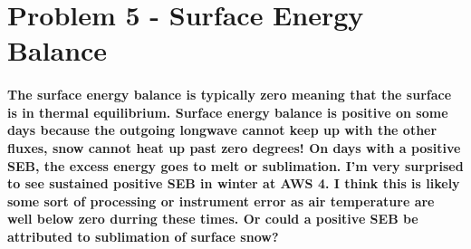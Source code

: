 \documentclass[11pt]{article}
\begin{document}
    \section{Problem 5 - Surface Energy
Balance}\label{problem-5---surface-energy-balance}

\paragraph{The surface energy balance is typically zero meaning that the
surface is in thermal equilibrium. Surface energy balance is positive on
some days because the outgoing longwave cannot keep up with the other
fluxes, snow cannot heat up past zero degrees! On days with a positive
SEB, the excess energy goes to melt or sublimation. I'm very surprised
to see sustained positive SEB in winter at AWS 4. I think this is likely
some sort of processing or instrument error as air temperature are well
below zero durring these times. Or could a positive SEB be attributed to
sublimation of surface
snow?}\label{the-surface-energy-balance-is-typically-zero-meaning-that-the-surface-is-in-thermal-equilibrium.-surface-energy-balance-is-positive-on-some-days-because-the-outgoing-longwave-cannot-keep-up-with-the-other-fluxes-snow-cannot-heat-up-past-zero-degrees-on-days-with-a-positive-seb-the-excess-energy-goes-to-melt-or-sublimation.-im-very-surprised-to-see-sustained-positive-seb-in-winter-at-aws-4.-i-think-this-is-likely-some-sort-of-processing-or-instrument-error-as-air-temperature-are-well-below-zero-durring-these-times.-or-could-a-positive-seb-be-attributed-to-sublimation-of-surface-snow}
\end{document}
